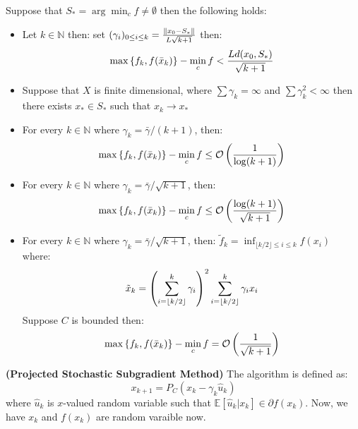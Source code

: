 \begin{corollary}
    Suppose that $S_* = \arg\min_c f \ne\emptyset$ then the following holds:
    \begin{itemize}
        \item Let $k\in\mathbb{N}$ then: set $(\gamma_i)_{0\le i\le k} = \frac{\left\lVert x_0-  S_*\right\rVert}{L\sqrt{k+1}}$ then:
        \begin{equation*}
            \max\left\{ f_k, f(\bar{x}_k) \right\} - \min_c f < \frac{Ld(x_0, S_*)}{\sqrt{k+1}}
        \end{equation*}
        \item Suppose that $X$ is finite dimensional, where $\sum\gamma_k=\infty$ and $\sum\gamma_k^2<\infty$ then there exists $x_*\in S_*$ such that $x_k\rightarrow x_*$
        \item For every $k\in\mathbb{N}$ where $\gamma_k = \bar{\gamma}/(k+1)$, then:
        \begin{equation*}
            \max\left\{ f_k, f(\bar{x}_k) \right\} - \min_c f \le \mathcal{O}\left( \frac{1}{\log(k+1)} \right)
        \end{equation*}
        \item For every $k\in\mathbb{N}$ where $\gamma_k = \bar{\gamma}/\sqrt{k+1}$, then:
        \begin{equation*}
            \max\left\{ f_k, f(\bar{x}_k) \right\} - \min_c f \le \mathcal{O}\left( \frac{\log(k+1)}{\sqrt{k+1}} \right)
        \end{equation*}
        \item For every $k\in\mathbb{N}$ where $\gamma_k = \bar{\gamma}/\sqrt{k+1}$, then: $\tilde{f}_k = \inf_{\lfloor k/2\rfloor \le i \le k}f(x_i)$ where:
        \begin{equation*}
            \tilde{x}_k = \left( \sum^k_{i=\lfloor k/2\rfloor}\gamma_i \right)^2\sum^k_{i=\lfloor k/2\rfloor} \gamma_ix_i
        \end{equation*}
        Suppose $C$ is bounded then: 
        \begin{equation*}
            \max\left\{ f_k, f(\bar{x}_k) \right\} - \min_c f = \mathcal{O}\left( \frac{1}{\sqrt{k+1}} \right)
        \end{equation*}
    \end{itemize}
\end{corollary}

\begin{definition}{\textbf{(Projected Stochastic Subgradient Method)}}
    The algorithm is defined as:
    \begin{equation*}
        x_{k+1} = P_C(x_k-\gamma_k\hat{u}_k)
    \end{equation*}
    where $\hat{u}_k$ is $x$-valued random variable such that $\mathbb{E}[\hat{u}_k | x_k] \in\partial f(x_k)$. Now, we have $x_k$ and $f(x_k)$ are random varaible now.
\end{definition}

